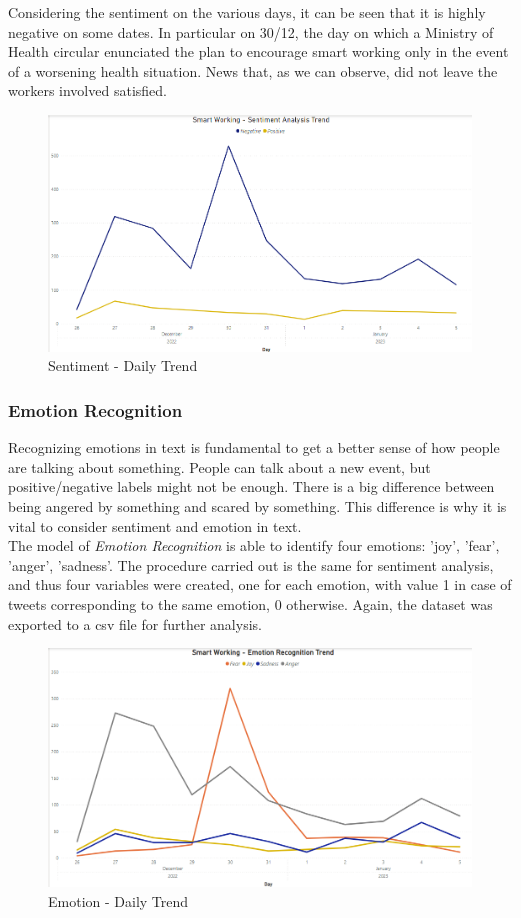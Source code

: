\documentclass[12pt,journal,compsoc]{IEEEtran}
\begin{document}
Considering the sentiment on the various days, it can be seen that it is highly negative on some dates. In particular on 30/12, the day on which a Ministry of Health circular enunciated the plan to encourage smart working only in the event of a worsening health situation. News that, as we can observe, did not leave the workers involved satisfied.

\begin{figure}[H]
  \includegraphics[scale=0.5]{./images/trend-sentiment.png}
  \caption{Sentiment - Daily Trend}
\end{figure}
\subsubsection{Emotion Recognition}
Recognizing emotions in text is fundamental to get a better sense of how people are talking about something. People can talk about a new event, but positive/negative labels might not be enough. There is a big difference between being angered by something and scared by something. This difference is why it is vital to consider sentiment and emotion in text.\\
The model of \textit{Emotion Recognition} is able to identify four emotions: 'joy', 'fear', 'anger', 'sadness'. The procedure carried out is the same for sentiment analysis, and thus four variables were created, one for each emotion, with value 1 in case of tweets corresponding to the same emotion, 0 otherwise. Again, the dataset was exported to a csv file for further analysis.

\begin{figure}[H]
  \includegraphics[scale=0.5]{./images/trend-emotion.png}
  \caption{Emotion - Daily Trend}
\end{figure}
\end{document}
